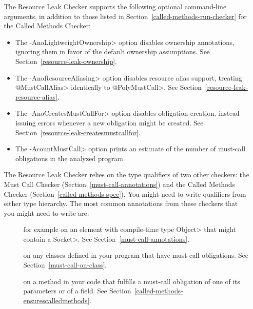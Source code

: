 The Resource Leak Checker supports the following optional command-line arguments,
in addition to those listed in Section~\ref{called-methods-run-checker} for
the Called Methods Checker:
\begin{itemize}
\item The \<-AnoLightweightOwnership> option disables ownership annotations,
  ignoring them in favor of the default ownership assumptions.
  See Section~\ref{resource-leak-ownership}.
\item The \<-AnoResourceAliasing> option disables resource alias support,
  treating \<@MustCallAlias> identically to \<@PolyMustCall>.
  See Section~\ref{resource-leak-resource-alias}.
\item The \<-AnoCreatesMustCallFor> option disables obligation creation,
  instead issuing errors whenever a new obligation might be created.
  See Section~\ref{resource-leak-createsmustcallfor}.
\item The \<-AcountMustCall> option prints an estimate of the number of
  must-call obligations in the analyzed program.
\end{itemize}



The Resource Leak Checker relies on the type qualifiers of two other checkers:
the Must Call Checker (Section~\ref{must-call-annotations}) and
the Called Methods Checker (Section~\ref{called-methods-spec}). You might need
to write qualifiers from either type hierarchy. The most common annotations from
these checkers that you might need to write are:

\begin{description}

\item[]
for example on an element with compile-time type \<Object> that might contain a \<Socket>.
See Section~\ref{must-call-annotations}.

\item[]
on any classes defined in your program that have must-call obligations. See Section~\ref{must-call-on-class}.

\item[] on a method in
your code that fulfills a must-call obligation of one of its parameters or of a field.
See Section~\ref{called-methods-ensurescalledmethods}.

\end{description}

